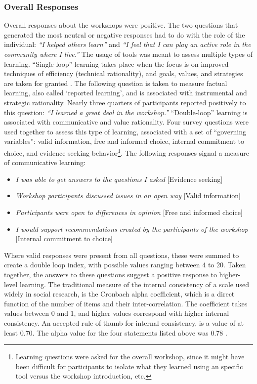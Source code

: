 {{        \subsubsection{Overall Responses}
        {
            Overall responses about the workshops were positive. The two questions that generated the most neutral or negative responses had to do with the role of the individual: \textit{``I helped others learn''} and \textit{``I feel that I can play an active role in the community where I live.''}
            The usage of tools was meant to assess multiple types of learning. ``Single-loop'' learning takes place when the focus is on improved techniques of efficiency (technical rationality), and goals, values, and strategies are taken for granted \cite{greenwood1998role}. The following question is taken to measure factual learning, also called `reported learning', and is associated with instrumental and strategic rationality. Nearly three quarters of participants reported positively to this question: \textit{``I learned a great deal in the workshop.''}
            \newline
            ``Double-loop'' learning is associated with communicative and value rationality. Four survey questions were used together to assess this type of learning, associated with a set of ``governing variables'': valid information, free and informed choice, internal commitment to choice, and evidence seeking behavior\footnote{Learning questions were asked for the overall workshop, since it might have been difficult for participants to isolate what they learned using an specific tool versus the workshop introduction, etc.}. The following responses signal a measure of communicative learning:

            \begin{itemize}
                \item \textit{I was able to get answers to the questions I asked} [Evidence seeking]
                \item \textit{Workshop participants discussed issues in an open way} [Valid information]
                \item \textit{Participants were open to differences in opinion} [Free and informed choice]
                \item \textit{I would support recommendations created by the participants of the workshop} [Internal commitment to choice]
            \end{itemize}

            Where valid responses were present from all questions, these were summed to create a double loop index, with possible values ranging between 4 to 20. Taken together, the answers to these questions suggest a positive response to higher-level learning. The traditional measure of the internal consistency of a scale used widely in social research, is the Cronbach alpha coefficient, which is a direct function of the number of items and their inter-correlation. The coefficient takes values between 0 and 1, and higher values correspond with higher internal consistency. An accepted rule of thumb for internal consistency, is a value of at least 0.70. The alpha value for the four statements listed above was 0.78 \cite{brown2002cronbach}.
        }

}}
